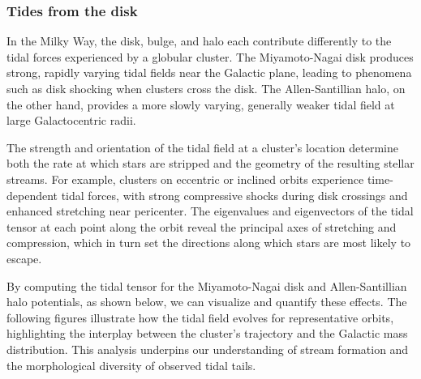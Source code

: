         \subsubsection{Tides from the disk}
            In the Milky Way, the disk, bulge, and halo each contribute differently to the tidal forces experienced by a globular cluster. The Miyamoto-Nagai disk produces strong, rapidly varying tidal fields near the Galactic plane, leading to phenomena such as disk shocking when clusters cross the disk. The Allen-Santillian halo, on the other hand, provides a more slowly varying, generally weaker tidal field at large Galactocentric radii.

            The strength and orientation of the tidal field at a cluster's location determine both the rate at which stars are stripped and the geometry of the resulting stellar streams. For example, clusters on eccentric or inclined orbits experience time-dependent tidal forces, with strong compressive shocks during disk crossings and enhanced stretching near pericenter. The eigenvalues and eigenvectors of the tidal tensor at each point along the orbit reveal the principal axes of stretching and compression, which in turn set the directions along which stars are most likely to escape.

            By computing the tidal tensor for the Miyamoto-Nagai disk and Allen-Santillian halo potentials, as shown below, we can visualize and quantify these effects. The following figures illustrate how the tidal field evolves for representative orbits, highlighting the interplay between the cluster's trajectory and the Galactic mass distribution. This analysis underpins our understanding of stream formation and the morphological diversity of observed tidal tails.

